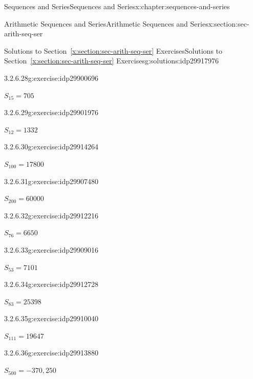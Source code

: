 \documentclass[twoside,10pt,]{book}
\newcommand{\xreffont}{\relax}
\numberwithin{equation}{section}
\begin{document}
\begin{chapterptx}{Sequences and Series}{}{Sequences and Series}{}{}{x:chapter:sequences-and-series}
\begin{sectionptx}{Arithmetic Sequences and Series}{}{Arithmetic Sequences and Series}{}{}{x:section:sec-arith-seq-ser}
\begin{solutions-subsection}{Solutions to Section~{\xreffont\ref*{x:section:sec-arith-seq-ser}} Exercises}{}{Solutions to Section~{\xreffont\ref*{x:section:sec-arith-seq-ser}} Exercises}{}{}{g:solutions:idp29917976}
\begin{divisionsolution}{3.2.6.28}{}{g:exercise:idp29900696}
\par\smallskip%
\noindent\hypertarget{g:solution:idp29901336-main}{}\(S_{15} = 705\)\end{divisionsolution}%
\begin{divisionsolution}{3.2.6.29}{}{g:exercise:idp29901976}%
\par\smallskip%
\noindent\hypertarget{g:solution:idp29910296-main}{}\(S_{12} = 1332\)\end{divisionsolution}%
\begin{divisionsolution}{3.2.6.30}{}{g:exercise:idp29914264}%
\par\smallskip%
\noindent\hypertarget{g:solution:idp29910808-main}{}\(S_{100} = 17800\)\end{divisionsolution}%
\begin{divisionsolution}{3.2.6.31}{}{g:exercise:idp29907480}%
\par\smallskip%
\noindent\hypertarget{g:solution:idp29913112-main}{}\(S_{200} = 60000\)\end{divisionsolution}%
\begin{divisionsolution}{3.2.6.32}{}{g:exercise:idp29912216}%
\par\smallskip%
\noindent\hypertarget{g:solution:idp29907608-main}{}\(S_{76} = 6650\)\end{divisionsolution}%
\begin{exercisegroup}
\begin{divisionsolutioneg}{3.2.6.33}{}{g:exercise:idp29909016}%
\par\smallskip%
\noindent\hypertarget{g:solution:idp29911576-main}{}\(S_{53} = 7101\)\end{divisionsolutioneg}%
\begin{divisionsolutioneg}{3.2.6.34}{}{g:exercise:idp29912728}%
\par\smallskip%
\noindent\hypertarget{g:solution:idp29908248-main}{}\(S_{83} = 25398\)\end{divisionsolutioneg}%
\begin{divisionsolutioneg}{3.2.6.35}{}{g:exercise:idp29910040}%
\par\smallskip%
\noindent\hypertarget{g:solution:idp29913496-main}{}\(S_{111} = 19647\)\end{divisionsolutioneg}%
\begin{divisionsolutioneg}{3.2.6.36}{}{g:exercise:idp29913880}%
\par\smallskip%
\noindent\hypertarget{g:solution:idp29914648-main}{}\(S_{500} = -370,250\)\end{divisionsolutioneg}%

\end{exercisegroup}
\end{solutions-subsection}
\end{sectionptx}
\end{chapterptx}
\end{document}
